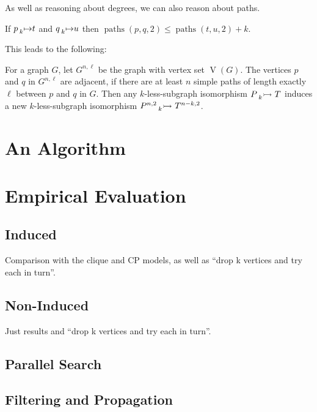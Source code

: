 \documentclass[letterpaper]{article}
\begin{document}
As well as reasoning about degrees, we can also reason about paths.

\begin{proposition}
    If $p \prescript{}{k}{\mapsto} t$ and $q \prescript{}{k}{\mapsto} u$ then
     $\operatorname{paths}(p, q, 2) \le \operatorname{paths}(t, u, 2) + k$.
\end{proposition}

This leads to the following:

\begin{proposition}
    For a graph $G$, let $G^{n, \ell}$ be the graph with vertex set $\operatorname{V}(G)$. The
    vertices $p$ and $q$ in $G^{n, \ell}$ are adjacent, if there are at least $n$ simple paths of
    length exactly $\ell$ between $p$ and $q$ in $G$. Then any $k$-less-subgraph isomorphism
    $P \prescript{}{k}{\rightarrowtail}\  T$ induces a new $k$-less-subgraph isomorphism
    $P^{n, 2}\prescript{}{k}{\rightarrowtail}\  T^{n - k, 2}$.
\end{proposition}

\section{An Algorithm}

\section{Empirical Evaluation}

\subsection{Induced}

Comparison with the clique and CP models, as well as ``drop k vertices and try each in turn''.

\subsection{Non-Induced}

Just results and ``drop k vertices and try each in turn''.

\subsection{Parallel Search}

\subsection{Filtering and Propagation}
\end{document}
